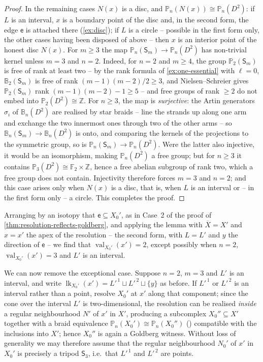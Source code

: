 \documentclass[reqno]{amsart}
\theoremstyle{definition}
\newcommand\sfS{\mathsf{S}}
\newcommand\sfe{\mathsf{e}}
\newcommand{\PB}{\mathbb{P}}
\newcommand{\BG}{\mathbb{B}}
\newcommand{\Z}{\mathbb{Z}}
\renewcommand{\bar}{\overline}
\DeclareMathOperator{\lk}{lk}
\DeclareMathOperator{\val}{val}
\numberwithin{equation}{section}
\begin{document}
\begin{proof}
In the remaining cases \(N(x)\) is a disc, and
\(\PB_n(N(x))\cong\PB_n(D^2)\): if \(L\) is an interval, \(x\)
is a boundary point of the disc and, in the second form, the
edge \(\sfe\) is attached there (\cref{ex:disc}); if \(L\) is a
circle -- possible in the first form only, the other cases
having been disposed of above -- then \(x\) is an interior point
of the honest disc \(N(x)\). For \(m\geq3\)
the map \(\PB_n(\sfS_m)\to\PB_n(D^2)\) has non-trivial kernel
unless \(m=3\) and \(n=2\). Indeed, for \(n=2\) and \(m\geq4\),
the group \(\PB_2(\sfS_m)\) is free of rank at least two -- by
the rank formula of \cref{ex:one-essential} with \(\ell=0\),
\(\BG_2(\sfS_m)\) is free of rank \((m-1)(m-2)/2\geq3\), and
Nielsen--Schreier gives \(\PB_2(\sfS_m)\) rank
\((m-1)(m-2)-1\geq5\) -- and free groups of rank \(\geq2\) do not
embed into \(\PB_2(D^2)\cong\Z\). For \(n\geq3\), the map is
\emph{surjective}: the Artin generators \(\sigma_i\) of
\(\BG_n(D^2)\) are realised by star braids -- line the strands
up along one arm and exchange the two innermost ones through two
of the other arms -- so \(\BG_n(\sfS_m)\to\BG_n(D^2)\) is onto,
and comparing the kernels of the projections to the symmetric
group, so is \(\PB_n(\sfS_m)\to\PB_n(D^2)\). Were the latter
also injective, it would be an isomorphism, making
\(\PB_n(D^2)\) a free group; but for \(n\geq3\) it contains
\(\PB_3(D^2)\cong\mathbb{F}_2\times\Z\), hence a free abelian
subgroup of rank two, which a free group does not contain.
Injectivity therefore forces \(m=3\) and \(n=2\); and this case
arises only when \(N(x)\) is a disc, that is, when \(L\) is an
interval or -- in the first form only -- a circle. This
completes the proof.
\end{proof}

Arranging by an isotopy that \(\sfe\subseteq X_0'\), as in Case~2
of the proof of \cref{thm:resolution-reflects-goldberg}, and
applying the lemma with \(\bar X=X'\) and \(x=x'\) the apex of
the resolution -- the second form, with \(L=L'\) and \(y\) the
direction of \(\sfe\) -- we find that \(\val_{X_0'}(x')=2\), except
possibly when \(n=2\), \(\val_{X_0'}(x')=3\) and \(L'\) is an
interval.

We can now remove the exceptional case. Suppose \(n=2\), \(m=3\)
and \(L'\) is an interval, and write
\(\lk_{X_0'}(x')=L'^{\,1}\sqcup L'^{\,2}\sqcup\{y\}\) as before.
If \(L'^{\,1}\) or \(L'^{\,2}\) is an interval rather than a
point, resolve \(X_0'\) at \(x'\) along that component; since the
cone over the interval \(L'\) is two-dimensional, the resolution
can be realised \emph{inside} a regular neighbourhood \(N'\) of
\(x'\) in \(X'\), producing a subcomplex
\(X_0''\subseteq X'\) together with a braid equivalence
\(\PB_n(X_0')\cong\PB_n(X_0'')\)
(\cite[Prop.~3.11]{AnPark2017}) compatible with the inclusions
into \(X'\); hence \(X_0''\) is again a Goldberg witness. Without
loss of generality we may therefore assume that the regular
neighbourhood \(N_0'\) of \(x'\) in \(X_0'\) is
precisely a tripod \(\sfS_3\), i.e.\ that \(L'^{\,1}\) and
\(L'^{\,2}\) are points.
\end{document}
